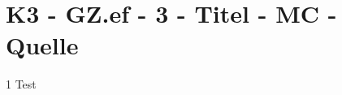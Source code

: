 \section{K3 - GZ.ef - 3 - Titel - MC - Quelle}

\begin{langesbeispiel} \item[1] %
Test
\end{langesbeispiel}